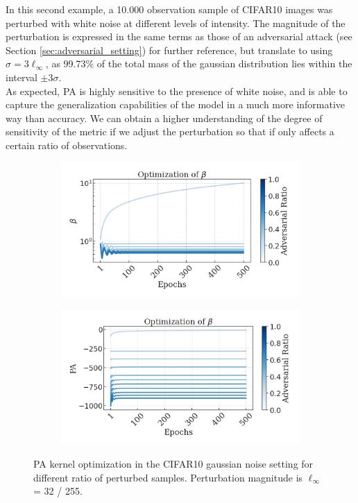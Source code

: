 In this second example, a 10.000 observation sample of CIFAR10 images was perturbed
with white noise at different levels of intensity. The magnitude of the perturbation
is expressed in the same terms as those of an adversarial 
attack (see Section \ref{sec:adversarial_setting}) for further 
reference, but translate to using $\sigma = 3 \ell_\infty$, as 99.73\% of the
total mass of the gaussian distribution lies within the interval $\pm 3\sigma$. \\

As expected, PA is highly sensitive to the presence of white noise,
and is able to capture the generalization capabilities of the model in a much more
informative way than accuracy. We can obtain a higher understanding of the degree of
sensitivity of the metric if we adjust the perturbation so that if only affects
a certain ratio of observations. \\

\begin{figure}[H]
    \centering
    \begin{subfigure}[b]{0.49\textwidth}
        \centering
        \includegraphics[width=\textwidth]{img/results_discussion/empirical/betas.png}
    \end{subfigure}
    \hfill
    \begin{subfigure}[b]{0.49\textwidth}
        \centering
        \includegraphics[width=\textwidth]{img/results_discussion/empirical/logpas.png}
    \end{subfigure}
    \caption{PA kernel optimization in the CIFAR10 gaussian noise setting for different ratio
    of perturbed samples. Perturbation magnitude is $\ell_\infty$ = 32 / 255.}
    \label{fig:gaussian_optimization}
\end{figure}

